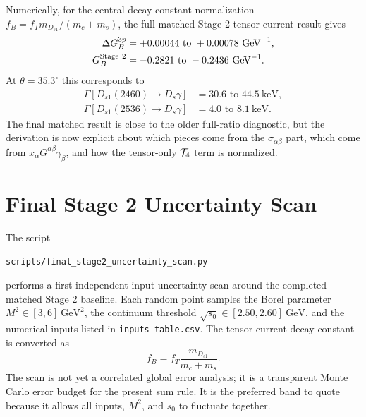 \documentclass[11pt]{article}
\begin{document}
Numerically, for the central decay-constant normalization
$f_B=f_Tm_{D_{s1}}/(m_c+m_s)$, the full matched Stage 2 tensor-current result
gives
\begin{align}
  \Delta G_B^{3p}
  &=
  +0.00044\text{ to }+0.00078\ \mathrm{GeV}^{-1},\\
  G_B^{\rm Stage\ 2}
  &=
  -0.2821\text{ to }-0.2436\ \mathrm{GeV}^{-1}.
\end{align}
At $\theta=35.3^\circ$ this corresponds to
\begin{align}
  \Gamma[D_{s1}(2460)\to D_s\gamma]
  &=
  30.6\text{ to }44.5\ \mathrm{keV},\\
  \Gamma[D_{s1}(2536)\to D_s\gamma]
  &=
  4.0\text{ to }8.1\ \mathrm{keV}.
\end{align}
The final matched result is close to the older full-ratio diagnostic, but the
derivation is now explicit about which pieces come from the
$\sigma_{\alpha\beta}$ part, which come from
$x_\alpha G^{\alpha\beta}\gamma_\beta$, and how the tensor-only
${\cal T}_4$ term is normalized.

\section{Final Stage 2 Uncertainty Scan}

The script
\begin{center}
  \texttt{scripts/final\_stage2\_uncertainty\_scan.py}
\end{center}
performs a first independent-input uncertainty scan around the completed
matched Stage 2 baseline.  Each random point samples the Borel parameter
$M^2\in[3,6]~\mathrm{GeV}^2$, the continuum threshold
$\sqrt{s_0}\in[2.50,2.60]~\mathrm{GeV}$, and the numerical inputs listed in
\texttt{inputs\_table.csv}.  The tensor-current decay constant is converted as
\begin{equation}
  f_B=f_T\frac{m_{D_{s1}}}{m_c+m_s}.
\end{equation}
The scan is not yet a correlated global error analysis; it is a transparent
Monte Carlo error budget for the present sum rule.  It is the preferred band to
quote because it allows all inputs, $M^2$, and $s_0$ to fluctuate together.
\end{document}
